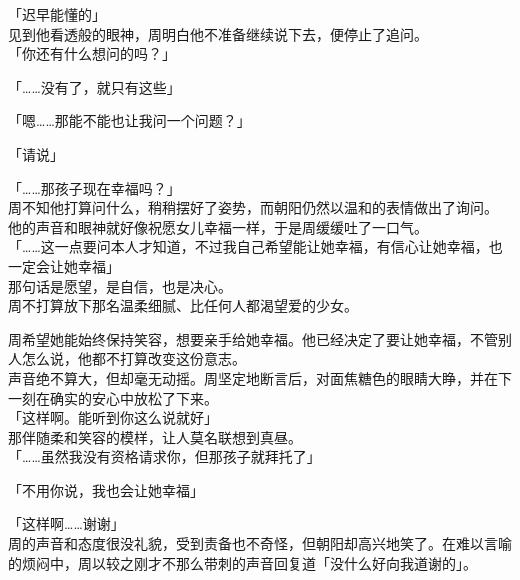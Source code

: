 「迟早能懂的」\\

见到他看透般的眼神，周明白他不准备继续说下去，便停止了追问。\\

「你还有什么想问的吗？」

「……没有了，就只有这些」

「嗯……那能不能也让我问一个问题？」

「请说」

「……那孩子现在幸福吗？」\\

周不知他打算问什么，稍稍摆好了姿势，而朝阳仍然以温和的表情做出了询问。\\

他的声音和眼神就好像祝愿女儿幸福一样，于是周缓缓吐了一口气。\\

「……这一点要问本人才知道，不过我自己希望能让她幸福，有信心让她幸福，也一定会让她幸福」\\

那句话是愿望，是自信，也是决心。\\

周不打算放下那名温柔细腻、比任何人都渴望爱的少女。

周希望她能始终保持笑容，想要亲手给她幸福。他已经决定了要让她幸福，不管别人怎么说，他都不打算改变这份意志。\\

声音绝不算大，但却毫无动摇。周坚定地断言后，对面焦糖色的眼睛大睁，并在下一刻在确实的安心中放松了下来。\\

「这样啊。能听到你这么说就好」\\

那伴随柔和笑容的模样，让人莫名联想到真昼。\\

「……虽然我没有资格请求你，但那孩子就拜托了」

「不用你说，我也会让她幸福」

「这样啊……谢谢」\\

周的声音和态度很没礼貌，受到责备也不奇怪，但朝阳却高兴地笑了。在难以言喻的烦闷中，周以较之刚才不那么带刺的声音回复道「没什么好向我道谢的」。
